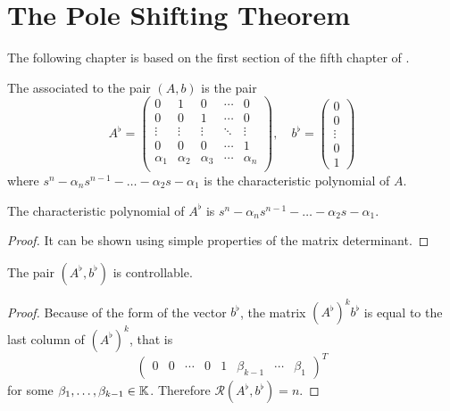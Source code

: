 \chapter{The Pole Shifting Theorem}

The following chapter is based on the first section of the fifth chapter of \citet{Sontag1998}.

\begin{definition}
    The  associated to the pair $(A,b)$ is the pair 
    \begin{equation*}
        A^\flat=
        \begin{pmatrix}
            0 & 1 & 0 & \cdots & 0 \\
            0 & 0 & 1 & \cdots & 0 \\
            \vdots & \vdots & \vdots & \ddots & \vdots \\
            0 & 0 & 0 & \cdots & 1 \\
            \alpha_1 & \alpha_2 & \alpha_3 & \cdots & \alpha_n \\
        \end{pmatrix},
        \quad
        b^\flat=
        \begin{pmatrix}
            0 \\
            0 \\
            \vdots \\
            0 \\
            1
        \end{pmatrix}
    \end{equation*}
    where $s^n-\alpha_ns^{n-1}-\ldots-\alpha_2s-\alpha_1$ is the characteristic polynomial of $A$.
\end{definition}

\begin{lemma}
\label{lem:flatCharPol}
    The characteristic polynomial of $A^\flat$ is $s^n-\alpha_ns^{n-1}-\ldots-\alpha_2s-\alpha_1$.
\end{lemma}

\begin{proof}
    It can be shown using simple properties of the matrix determinant.
\end{proof}

\begin{lemma}
\label{lem:flatControllable}
    The pair $(A^\flat,b^\flat)$ is controllable.
\end{lemma}

\begin{proof}
    Because of the form of the vector $b^\flat$, the matrix $(A^\flat)^kb^\flat$ is equal to the last column of $(A^\flat)^k$, that is
    \begin{equation*}
        \begin{pmatrix}
            0 &
            0 &
            \cdots &
            0 &
            1 &
            \beta_{k-1} &
            \cdots &
            \beta_1
        \end{pmatrix}^T
    \end{equation*}
    for some $\beta_1,\ldots,\beta_{k-1}\in\mathbb{K}$. Therefore $\mathcal{R}(A^\flat,b^\flat)=n$.
\end{proof}

